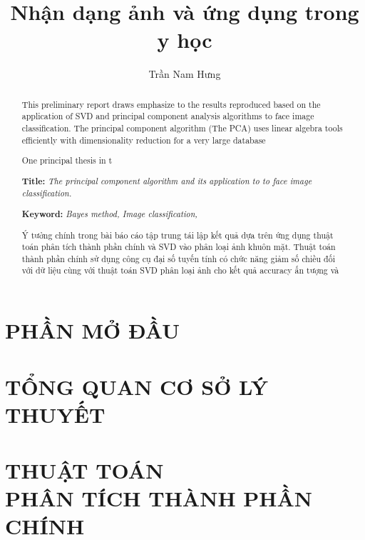 \documentclass[a4paper, oneside]{report}			%
\title{Nhận dạng ảnh và ứng dụng trong y học}
\author{Trần Nam Hưng}
\theoremstyle{plain} %
\theoremstyle{plain} %
\theoremstyle{nonumberplain} %
\begin{document}


\begin{abstract}
	This preliminary report draws emphasize to the results reproduced based on the application of SVD and principal component analysis algorithms to face image classification. The principal component algorithm (The PCA) uses linear algebra tools efficiently with dimensionality reduction for a very large database 

	One principal thesis in t
	
	\textbf{Title:} \emph{The principal component algorithm and its application to to face image classification.}
	
	\textbf{Keyword:} \textit{Bayes method, Image classification,}
\end{abstract}

\begin{abstract}
	Ý tưởng chính trong bài báo cáo tập trung tái lập kết quả dựa trên ứng dụng thuật toán phân tích thành phần chính và SVD vào phân loại ảnh khuôn mặt. Thuật toán thành phần chính sử dụng công cụ đại số tuyến tính có chức năng giảm số chiều đối với dữ liệu cùng với thuật toán SVD phân loại ảnh cho kết quả accuracy ấn tượng và 
\end{abstract}

\tableofcontents			%
\listoffigures				%


\chapter*{PHẦN MỞ ĐẦU}


	
\chapter{TỔNG QUAN CƠ SỞ LÝ THUYẾT}\label{chap.0}
\setcounter{page}{1}			%

\chapter[THUẬT TOÁN PHÂN TÍCH THÀNH PHẦN CHÍNH]{THUẬT TOÁN \\ PHÂN TÍCH THÀNH PHẦN CHÍNH}\label{chap.2}
\end{document}
